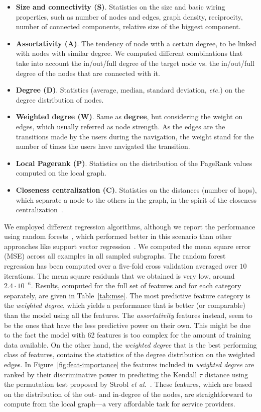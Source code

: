 \documentclass{sig-alternate-2013}
\newcommand{\etc}{\emph{etc.}}
\newcommand{\etal}{\emph{et al.}}
\begin{document}
\begin{itemize}
\item \textbf{Size and connectivity (S)}. Statistics on the size and basic wiring
properties, such as number of nodes and edges, graph density, reciprocity,
number of connected components, relative size of the biggest component.
\item \textbf{Assortativity (A)}. The tendency of node with a certain degree, to be
linked with nodes with similar degree. We computed different combinations that
take into account the in/out/full degree of the target node vs. the in/out/full
degree of the nodes that are connected with it.
\item \textbf{Degree (D)}. Statistics (average, median, standard deviation, \etc) on
the degree distribution of nodes.
\item \textbf{Weighted degree (W)}. Same as \textbf{degree}, but considering the
weight on edges, which usually referred as node strength. As the edges are the
transitions made by the users during the navigation, the weight stand for the
number of times the users have navigated the transition.
\item \textbf{Local Pagerank (P)}. Statistics on the distribution of the PageRank
values computed on the local graph.
\item \textbf{Closeness centralization (C)}. Statistics on the distances (number of
hops), which separate a node to the others in the graph, in the spirit of the
closeness centralization~\cite{wasserman94social}.
\end{itemize}
We employed different regression algorithms, although we report the performance
using random forests~\cite{Breiman:2001:RF:570181.570182}, which performed
better in this scenario than other approaches like support vector
regression~\cite{Smola03atutorial}. We computed the mean square error (MSE)
across all examples in all sampled subgraphs. 
The random forest regression has been computed over a five-fold cross validation averaged over $10$ iterations.
The mean square residuals that we obtained is very low, around $2.4\cdot10^{-6}$.
Results, computed for the full
set of features and for each category separately, are given in
Table~\ref{tab:mse}. The most predictive feature category is the \emph{weighted degree}, which yields a performance that is better (or comparable) than the model
using all the features. The \emph{assortativity} features instead, seem to be the ones that have the less predictive power on their own.
This might be due to the fact the model with 62 features is too complex for the amount of training data available. On the other hand, the \emph{weighted degree} that is the best performing class of features, contains the statistics of the degree distribution on the weighted edges. 
In Figure~\ref{fig:feat-importance} the features included in \emph{weighted degree} are ranked by their discriminative power in predicting the Kendall $\tau$ distance using the permutation test proposed by Strobl \etal~\cite{Strobl2008rf}. These features, which are based on the distribution of the out- and in-degree of the nodes, are straightforward to compute from the local graph---a very affordable task for service providers.
\end{document}
